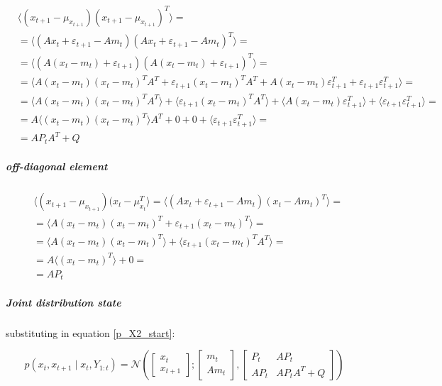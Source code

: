 \documentclass{article}
\newcommand{\E}[1]{\langle #1 \rangle} %
\newcommand{\norm}[3]{\mathcal{N}\left(#1; #2, #3\right)}
\begin{document}
\begin{equation}\label{eq:cov_x_t1_x_t1}
\begin{split}
    &\E{(x_{t+1}-\mu_{x_{t+1}})(x_{t+1}-\mu_{x_{t+1}})^T} =\\
    &=\E{(Ax_t + \varepsilon_{t+1} - Am_t)(Ax_t + \varepsilon_{t+1}- Am_t)^T} =\\
    &= \E{(A(x_t - m_t) + \varepsilon_{t+1})(A(x_t - m_t) + \varepsilon_{t+1})^T} =\\
    &=\E{A(x_t-m_t)(x_t-m_t)^TA^T + \varepsilon_{t+1}(x_t-m_t)^TA^T + A(x_t-m_t)\varepsilon_{t+1}^T + \varepsilon_{t+1}\varepsilon_{t+1}^T} =\\&=\E{A(x_t-m_t)(x_t-m_t)^TA^T} + \E{\varepsilon_{t+1}(x_t-m_t)^TA^T} + \E{A(x_t-m_t)\varepsilon_{t+1}^T} + \E{\varepsilon_{t+1}\varepsilon_{t+1}^T} =\\
    &=A\E{(x_t-m_t)(x_t-m_t)^T}A^T + 0 + 0 + \E{\varepsilon_{t+1}\varepsilon_{t+1}^T} = \\
    &=AP_tA^T + Q
\end{split}
\end{equation}

\subparagraph{off-diagonal element}

\begin{equation}\label{eq:cov_x_t1_x_t}
\begin{split}
    &\E{(x_{t+1}-\mu_{x_{t+1}}) (x_{t}-\mu_{x_{t}}^T} = \E{(Ax_t + \varepsilon_{t+1} -Am_t)(x_t - Am_t)^T} =\\
    &=\E{A(x_t - m_t)(x_t - m_t)^T + \varepsilon_{t+1}(x_t - m_t)^T} =\\&=\E{A(x_t - m_t)(x_t - m_t)^T} + \E{\varepsilon_{t+1}(x_t - m_t)^TA^T} =\\
    &=A\E{(x_t - m_t)^T} + 0 = \\
    &=AP_t
\end{split}
\end{equation}

\subparagraph{Joint distribution state}

substituting in equation \ref{p_X2_start}:

\begin{equation}\label{p_X2_final}
p(x_t, x_{t+1}\mid x_t, Y_{1:t}) = \norm{\begin{bmatrix}x_t\\x_{t+1}\end{bmatrix}}{\begin{bmatrix}m_t\\Am_t\end{bmatrix}}
{\begin{bmatrix}P_t & AP_t\\AP_t & AP_tA^T + Q\end{bmatrix}}
\end{equation}
\end{document}
